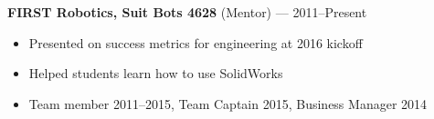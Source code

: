 \documentclass[12pt, oneside]{article}
\newcommand{\jobtitle}[2] {
	{\bf #1} {#2} \vspace{-10pt} \\
}
\begin{document}
\begin{flushleft}
\jobtitle{FIRST Robotics, Suit Bots 4628}{(Mentor) — 2011–Present}
\begin{itemize}
	\item Presented on success metrics for engineering at 2016 kickoff
	\item Helped students learn how to use SolidWorks
	\item Team member 2011–2015, Team Captain 2015, Business Manager 2014
\end{itemize}\vspace{-7pt}






\end{flushleft}
\end{document}
